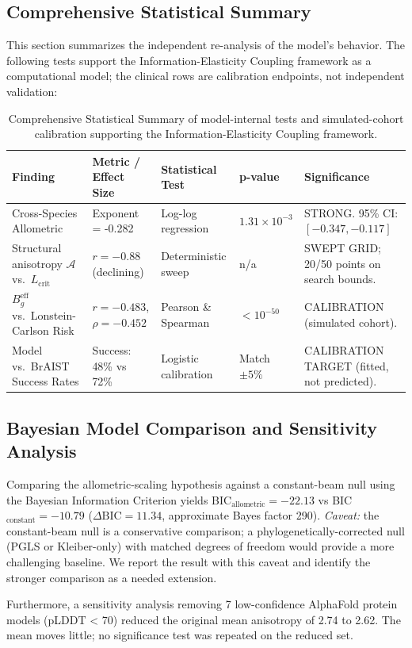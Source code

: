 \subsection{Comprehensive Statistical Summary}

This section summarizes the independent re-analysis of the model's behavior. The following tests support the Information-Elasticity Coupling framework as a computational model; the clinical rows are calibration endpoints, not independent validation:

\begin{table}[h]
\centering
\footnotesize
\setlength{\tabcolsep}{4pt}
\begin{tabular}{|p{}|p{}|p{}|p{}|p{}|}
\hline
\textbf{Finding} & \textbf{Metric / Effect Size} & \textbf{Statistical Test} & \textbf{p-value} & \textbf{Significance} \\ \hline
Cross-Species Allometric & Exponent = -0.282 & Log-log regression & $1.31\times10^{-3}$ & STRONG. 95\% CI: $[-0.347, -0.117]$ \\ \hline
Structural anisotropy $\mathcal{A}$ vs.\ $L_{\mathrm{crit}}$ & $r = -0.88$ (declining) & Deterministic sweep & n/a & SWEPT GRID; 20/50 points on search bounds. \\ \hline
$B_g^{\mathrm{eff}}$ vs.\ Lonstein-Carlson Risk & $r = -0.483$, $\rho = -0.452$ & Pearson \& Spearman & $< 10^{-50}$ & CALIBRATION (simulated cohort). \\ \hline
Model vs.\ BrAIST Success Rates & Success: 48\% vs 72\% & Logistic calibration & Match $\pm 5\%$ & CALIBRATION TARGET (fitted, not predicted). \\ \hline
\end{tabular}
\caption{Comprehensive Statistical Summary of model-internal tests and simulated-cohort calibration supporting the Information-Elasticity Coupling framework.}
\label{tab:comprehensive_stats}
\end{table}


\subsection{Bayesian Model Comparison and Sensitivity Analysis}
Comparing the allometric-scaling hypothesis against a constant-beam null using the Bayesian Information Criterion yields BIC$_{\text{allometric}} = -22.13$ vs BIC$_{\text{constant}} = -10.79$ ($\Delta\text{BIC} = 11.34$, approximate Bayes factor 290). \textit{Caveat:} the constant-beam null is a conservative comparison; a phylogenetically-corrected null (PGLS or Kleiber-only) with matched degrees of freedom would provide a more challenging baseline. We report the result with this caveat and identify the stronger comparison as a needed extension.

Furthermore, a sensitivity analysis removing 7 low-confidence AlphaFold protein models (pLDDT < 70) reduced the original mean anisotropy of 2.74 to 2.62. The mean moves little; no significance test was repeated on the reduced set.
